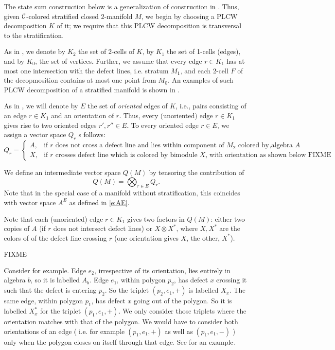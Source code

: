 \begin{defectfiguresetup}
The state sum construction below is a generalization of construction in
. Thus, given $\mathcal{C}$-colored stratified closed 2-manifold
$M$, we begin by choosing a PLCW decomposition $K$ of it; we require that this
PLCW decomposition is transversal to the stratification.


As in , we denote by $K_2$ the set of 2-cells of $K$, by
$K_1$ the set of 1-cells (edges), and by  $K_0$, the set of vertices. Further,
we assume that every edge $r\in K_1$ has at most one intersection with the
defect lines, i.e. stratum $M_1$, and each 2-cell $F$ of the decopmosition
contains at most one point from $M_0$. An examples of such PLCW decomposition
of a stratified manifold is shown in .



As in , we will denote by $E$ the set of \emph{oriented}
edges of $K$, i.e., pairs consisting of an edge $r\in K_1$ and an orientation
of $r$. Thus, every (unoriented) edge $r\in K_1$ gives rise to two oriented
edges $r', r''\in E$. To every oriented edge $r\in E$, we assign a vector space
$Q_r$ s follows:
\begin{equation}\label{e:q-definition}
	Q_{r} =
	\begin{cases}
		A, & \text{if $r$ does not cross a defect line and lies within component of
		$M_2$ colored by algebra $A$ },\\
		X, & \text{if $r$ crosses defect line which is colored by bimodule $X$,
    with orientation as shown below FIXME}
	\end{cases}
	\end{equation}

We define an intermediate vector space $Q(M)$ by tensoring the contribution of
\begin{equation}\label{e:Qr}
	Q(M) = \bigotimes_{r\in E} Q_r.
\end{equation}
Note that in the special case of a manifold without stratification, this
coincides with vector space $A^E$ as defined in \eqref{e:AE}.

Note that each (unoriented) edge $r\in K_1$ gives two factors in $Q(M)$: either
two copies of $A$ (if $r$ does not intersect defect lines) or $X\otimes X^*$,
where $X, X^*$ are the colors of of the defect line crossing $r$ (one
orientation gives $X$, the other, $X^*$).


FIXME

Consider   for example. Edge $e_2$, irrespective of
its orientation, lies entirely in algebra $b$, so it is labelled $A_b$. Edge
$e_1$, within polygon $p_2$, has defect $x$ crossing it such that the defect is
entering $p_2$.  So the triplet $(p_2,e_1,+)$ is labelled $X_x$. The same edge,
within polygon $p_1$, has defect $x$ going out of the polygon. So it is
labelled $X_x^*$ for the triplet $(p_1,e_1,+)$.  We only consider those
triplets where the orientation matches with that of the polygon. We would have
to consider both orientations of an edge ( i.e. for example $(p_1,e_1,+)$ as
well as $(p_1,e_1,-)$ ) only when the polygon closes on itself through that
edge. See \cite[Section 3.5]{dkr} for an example.


\end{defectfiguresetup}

